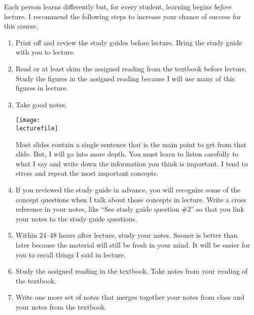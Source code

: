 \documentclass[letterpaper]{tufte-handout}
\newcommand\lecturefile{163_lecture01_fullsize}
\begin{document}
Each person learns differently but, for every student, learning begins \emph{before} lecture.  I recommend the following steps to increase your chance of success for this course. 



\begin{enumerate}

	\item Print off and review the study guides before lecture. Bring the study guide with you to lecture.
	
	\item Read or at least skim the assigned reading from the textbook before lecture. Study the figures in the assigned reading because I will use many of this figures in lecture.
	
	\item Take good notes.\begin{marginfigure}\texttt{[image: \\lecturefile]}\end{marginfigure} Most slides contain a single sentence that is the main point to get from that slide. But, I will go into more depth. You must learn to listen carefully to what I say and write down the information you think is important. I tend to stress and repeat the most important concepts. 
	
	\item If you reviewed the study guide in advance, you will recognize some of the concept questions when I talk about those concepts in lecture. Write a cross reference in your notes, like “See study guide question \#2” so that you link your notes to the study guide questions.
	
	\item Within 24–48 hours after lecture, study your notes.  Sooner is better than later because the material will still be fresh in your mind. It will be easier for you to recall things I said in lecture.
	
	\item Study the assigned reading in the textbook. Take notes from your reading of the textbook.
	
	\item Write one more set of notes that merges together your notes from class and your notes from the textbook.  
	

\end{enumerate}
\end{document}
